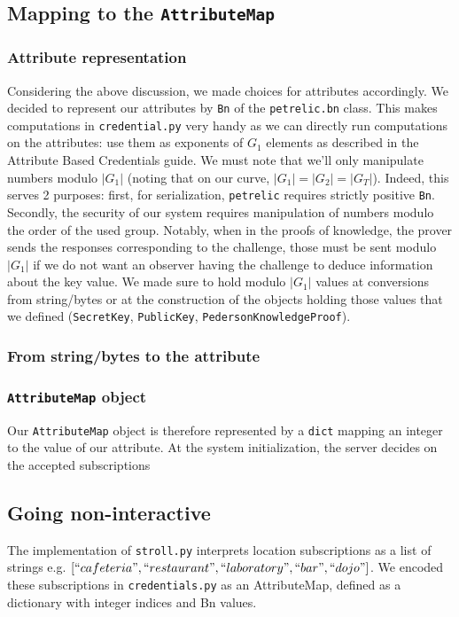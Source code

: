 \documentclass[10pt,conference,compsocconf]{IEEEtran}
\begin{document}
\subsection{Mapping to the \texttt{AttributeMap}}
\subsubsection{Attribute representation}
Considering the above discussion, we made choices for attributes accordingly. We decided to represent our attributes by \texttt{Bn} of the \texttt{petrelic.bn} class. This makes computations in \texttt{credential.py} very handy as we can directly run computations on the attributes: use them as exponents of $G_1$ elements as described in the Attribute Based Credentials guide. We must note that we'll only manipulate numbers modulo $|G_1|$ (noting that on our curve, $|G_1|=|G_2|=|G_T|$). Indeed, this serves 2 purposes: first, for serialization, \texttt{petrelic} requires strictly positive \texttt{Bn}. Secondly, the security of our system requires manipulation of numbers modulo the order of the used group. Notably, when in the proofs of knowledge, the prover sends the responses corresponding to the challenge, those must be sent modulo $|G_1|$ if we do not want an observer having the challenge to deduce information about the key value. We made sure to hold modulo $|G_1|$ values at conversions from string/bytes or at the construction of the objects holding those values that we defined (\texttt{SecretKey}, \texttt{PublicKey}, \texttt{PedersonKnowledgeProof}).

\subsubsection{From string/bytes to the attribute}

\subsubsection{\texttt{AttributeMap} object}
Our \texttt{AttributeMap} object is therefore represented by a \texttt{dict} mapping an integer to the value of our attribute. At the system initialization, the server decides on the accepted subscriptions
\subsection{Going non-interactive}

The implementation of \texttt{stroll.py} interprets location subscriptions as a list of strings e.g. $[``cafeteria", ``restaurant", ``laboratory", ``bar", ``dojo"]$. 
We encoded these subscriptions in \texttt{credentials.py} as an AttributeMap, defined as a dictionary with integer indices and Bn values. 
\end{document}
